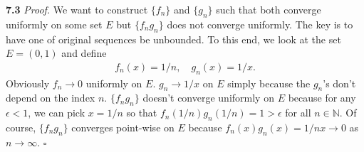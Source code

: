 \documentclass[11pt]{article}
\begin{document}
\noindent \textbf{7.3}
\noindent \textit{Proof.} We want to construct $\{f_n\}$ and $\{g_n\}$ such that both converge uniformly on some set $E$ but $\{f_ng_n\}$ does not converge uniformly. The key is to have one of original sequences be unbounded. To this end, we look at the set $E = (0,1)$ and define
\begin{align*}
f_n(x) = 1/n, \quad g_n(x) = 1/x.
\end{align*} 
Obviously $f_n \to 0$ uniformly on $E$.  $g_n \to 1/x$ on $E$ simply because the $g_n$'s don't depend on the index $n$. $\{f_ng_n\}$ doesn't converge uniformly on $E$ because for any $\epsilon < 1$, we can pick $x = 1/n$ so that $f_n(1/n)g_n(1/n) = 1 > \epsilon$ for all $n \in \mathbb{N}$. Of course, $\{f_ng_n\}$ converges point-wise on $E$ because $f_n(x)g_n(x) = 1/nx \to 0$ as $n\to \infty$. \hfill $\square$\\
\end{document}
